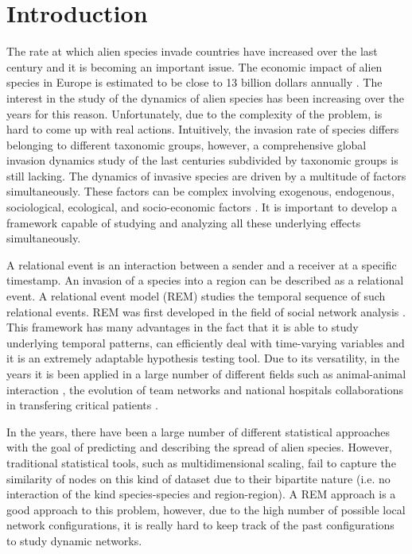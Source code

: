 \documentclass[mscthesis]{usiinfthesis}
\begin{document}
\chapter{Introduction}

The rate at which alien species invade countries have increased over the last century and it is becoming an important issue. The economic impact of alien species in Europe is estimated to be close to 13 billion dollars annually \cite{intro:rate}. The interest in the study of the dynamics of alien species has been increasing over the years for this reason. Unfortunately, due to the complexity of the problem, is hard to come up with real actions. Intuitively, the invasion rate of species differs belonging to different taxonomic groups, however, a comprehensive global invasion dynamics study of the last centuries subdivided by taxonomic groups is still lacking. The dynamics of invasive species are driven by a multitude of factors simultaneously. These factors can be complex involving exogenous, endogenous, sociological, ecological, and socio-economic factors \cite{intro:factors}. It is important to develop a framework capable of studying and analyzing all these underlying effects simultaneously. 

A relational event is an interaction between a sender and a receiver at a specific timestamp. An invasion of a species into a region can be described as a relational event. A relational event model (REM) studies the temporal sequence of such relational events. REM was first developed in the field of social network analysis \cite{rem:butts}. This framework has many advantages in the fact that it is able to study underlying temporal patterns, can efficiently deal with time-varying variables and it is an extremely adaptable hypothesis testing tool. Due to its versatility, in the years it is been applied in a large number of different fields such as animal-animal interaction \cite{intro:cattle}, the evolution of team networks \cite{intro:teams} and national hospitals collaborations in transfering critical patients \cite{intro:hospital}. 

In the years, there have been a large number of different statistical approaches with the goal of predicting and describing the spread of alien species. However, traditional statistical tools, such as multidimensional scaling, fail to capture the similarity of nodes on this kind of dataset due to their bipartite nature (i.e. no interaction of the kind species-species and region-region). A REM approach is a good approach to this problem, however, due to the high number of possible local network configurations, it is really hard to keep track of the past configurations to study dynamic networks.
\end{document}
